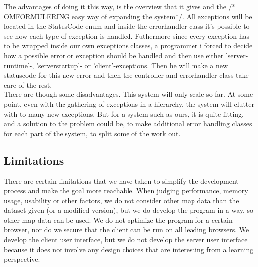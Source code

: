 \documentclass[a4paper,10pt,titlepage]{article}
\begin{document}
			The advantages of doing it this way, is the overview that it gives and the /* OMFORMULERING easy way of expanding the system*/. All exceptions will be located in the StatusCode enum and inside the errorhandler class it's possible to see how each type of exception is handled. Futhermore since every exception has to be wrapped inside our own exceptions classes, a programmer i forced to decide how a possible error or exception should be handled and then use either 'server-runtime'-, 'serverstartup'- or 'client'-exceptions. Then he will make a new statuscode for this new error and then the controller and errorhandler class take care of the rest.\\
		There are though some disadvantages. This system will only scale so far. At some point, even with the gathering of exceptions in a hierarchy, the system will clutter with to many new exceptions. But for a system such as ours, it is quite fitting, and a solution to the problem could be, to make additional error handling classes for each part of the system, to split some of the work out.\\

		\newpage
		\subsection{Limitations}
		There are certain limitations that we have taken to simplify the development process and make the goal more reachable. When judging performance, memory usage, usability or other factors, we do not consider other map data than the dataset given (or a modified version), but we do develop the program in a way, so other map data can be used. We do not optimize the program for a certain browser, nor do we secure that the client can be run on all leading browsers. We develop the client user interface, but we do not develop the server user interface because it does not involve any design choices that are interesting from a learning perspective.
				
\end{document}
